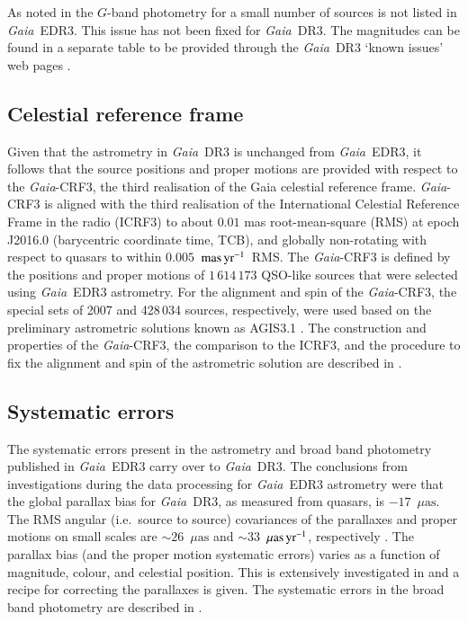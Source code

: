 \documentclass[longauth]{aa}
\providecommand\gmag{\ensuremath{G}\xspace}
\providecommand{\maspyr}{\ensuremath{\textrm{mas\,yr}^{-1}}}
\providecommand\muasyr{\ensuremath{\mu\text{as\,yr}^{-1}}}
\providecommand\muas{\ensuremath{\mu\text{as}}\xspace}
\newcommand\gaia{\textit{Gaia}\xspace}
\providecommand\gdr[1]{\textit{Gaia}~DR#1\xspace}
\providecommand\gedr[1]{\textit{Gaia}~EDR#1\xspace}
\newcommand\gdrthreegcrftot{\ensuremath{1\,614\,173}\xspace}
\begin{document}
As noted in \cite{EDR3-DPACP-130} the \gmag-band photometry for a small number of sources is not listed in \gedr{3}. This issue has not been fixed for \gdr{3}. The magnitudes can be found in a separate table to be provided through the \gdr{3} `known issues' web pages \citep[for details see section 8.2 in][]{EDR3-DPACP-117}.

\subsection{Celestial reference frame}



Given that the astrometry in \gdr{3} is unchanged from
\gedr{3}, it follows that the source positions and proper motions
are provided with respect to the \gaia-CRF3, the third
realisation of the Gaia celestial reference frame. \gaia-CRF3
is aligned with the third realisation of the International Celestial
Reference Frame in the radio (ICRF3) to about $0.01$ mas root-mean-square
(RMS) at epoch J2016.0 (barycentric coordinate time, TCB), and globally
non-rotating with respect to quasars to within $0.005$~\maspyr\  RMS. The
\gaia-CRF3 is defined by the positions and proper motions of
\gdrthreegcrftot QSO-like sources that were selected using \gedr{3}
astrometry. For the alignment and spin of the \gaia-CRF3, the special
sets of 2007 and 428\,034 sources, respectively, were used based on the
preliminary astrometric solutions known as AGIS3.1
\citep{EDR3-DPACP-128}. The construction and properties of the
\gaia-CRF3, the
comparison to the ICRF3, and the procedure to fix the alignment
and spin of the astrometric solution are described in \citet{EDR3-DPACP-133}.

\subsection{Systematic errors}

The systematic errors present in the astrometry and broad band photometry published in \gedr{3} carry over to \gdr{3}. The conclusions from investigations during the data processing for \gedr{3} astrometry were that the global parallax bias for \gdr{3}, as measured from quasars, is $-17$~\muas. The RMS angular (i.e.\ source to source) covariances of the parallaxes and proper motions on small scales are $\sim26$~\muas and $\sim33$~\muasyr, respectively \citep[see][for details]{EDR3-DPACP-128}. The parallax bias (and the proper motion systematic errors) varies as a function of magnitude, colour, and celestial position. This is extensively investigated in \cite{EDR3-DPACP-132} and a recipe for correcting the parallaxes is given. The systematic errors in the broad band photometry are described in \cite{EDR3-DPACP-117}.
\end{document}
